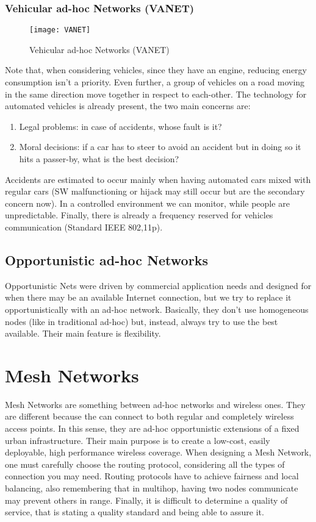 \subsubsection{Vehicular ad-hoc Networks (VANET)}	

\begin{figure}[t]
  \centering
  \texttt{[image: VANET]}
  \caption{Vehicular ad-hoc Networks (VANET)}
  \label{fig:mn:VANET}
\end{figure}

Note that, when considering vehicles, since they have an engine, 
reducing energy consumption isn't a priority. Even further, a group of vehicles 
on a road moving in the same direction move together in respect to each-other. 
The technology for automated vehicles is already present, the two main concerns 
are:
\begin{enumerate}
\item Legal problems: in case of accidents, whose fault is it?
\item Moral decisions: if a car has to steer to avoid an 
  accident but in doing so it hits a passer-by, what is the best decision?
\end{enumerate}
Accidents are estimated to occur mainly when having automated cars mixed 
with regular cars (SW malfunctioning or hijack may still occur but are the 
secondary concern now). In a controlled environment we can monitor, while people 
are unpredictable. 
Finally, there is already a frequency reserved for vehicles 
communication (Standard IEEE 802,11p).

\subsection{Opportunistic ad-hoc Networks}
Opportunistic Nets were driven by commercial application needs and 
designed for when there may be an available Internet connection, but we try to 
replace it opportunistically with an ad-hoc network. Basically, they don't use 
homogeneous nodes (like in traditional ad-hoc) but, instead, always try to use 
the best available. Their main feature is flexibility.

\section{Mesh Networks}
Mesh Networks are something between ad-hoc networks and wireless ones. 
They are different because the can connect to both regular and completely 
wireless access points. In this sense, they are ad-hoc opportunistic extensions 
of a fixed urban infrastructure.
Their main purpose is to create a low-cost, easily deployable, high 
performance wireless coverage. When designing a Mesh Network, one must carefully 
choose the routing protocol, considering all the types of connection you may 
need. Routing protocols have to achieve fairness and local balancing, also 
remembering that in multihop, having two nodes communicate may prevent others in 
range.
Finally, it is difficult to determine a quality of service, that is 
stating a quality standard and being able to assure it.

